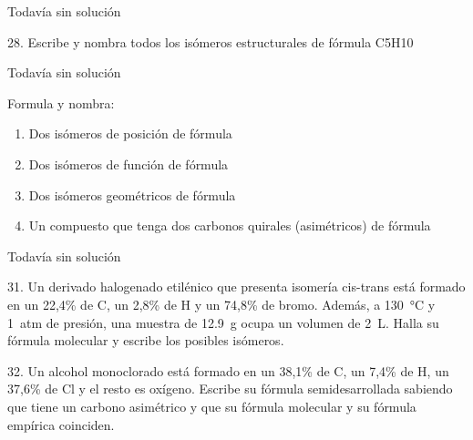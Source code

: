 \documentclass{article}
\begin{document}
\begin{solution}[print=false]
  Todavía sin solución
\end{solution}

\begin{exercise}
  28. Escribe y nombra todos los isómeros estructurales de fórmula C5H10
\end{exercise}

\begin{solution}[print=false]
  Todavía sin solución
\end{solution}

\begin{exercise}
  Formula y nombra:
  \begin{enumerate}
    \item Dos isómeros de posición de fórmula 
    \item Dos isómeros de función de fórmula 
    \item Dos isómeros geométricos de fórmula 
    \item Un compuesto que tenga dos carbonos quirales (asimétricos) de fórmula 
  \end{enumerate}
\end{exercise}

\begin{solution}[print=false]
  Todavía sin solución
\end{solution}

\begin{exercise}
  31. Un derivado halogenado etilénico que presenta isomería cis-trans
  está formado en un 22,4\% de C, un 2,8\% de H y un
  74,8\% de bromo. Además, a \SI{130}{\celsius} y \SI{1}{atm} de presión, una muestra de \SI{12,9}{\gram} ocupa un volumen de \SI{2}{\liter}. Halla su fórmula molecular y escribe los posibles isómeros.
\end{exercise}

\begin{solution}
\end{solution}

\begin{exercise}
  32. Un alcohol monoclorado está formado en un 38,1\% de C,
  un 7,4\% de H, un 37,6\% de Cl y el resto es oxígeno. Escribe
  su fórmula semidesarrollada sabiendo que tiene un carbono
  asimétrico y que su fórmula molecular y su fórmula empírica
  coinciden.
\end{exercise}

\begin{solution}
\end{solution}
\end{document}
